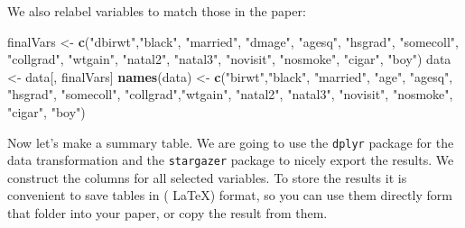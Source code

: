 \documentclass[]{book}
\newenvironment{Shaded}{\begin{snugshade}}{\end{snugshade}}
\newcommand{\KeywordTok}[1]{\textcolor[rgb]{0.13,0.29,0.53}{\textbf{#1}}}
\newcommand{\DecValTok}[1]{\textcolor[rgb]{0.00,0.00,0.81}{#1}}
\newcommand{\StringTok}[1]{\textcolor[rgb]{0.31,0.60,0.02}{#1}}
\newcommand{\OperatorTok}[1]{\textcolor[rgb]{0.81,0.36,0.00}{\textbf{#1}}}
\newcommand{\NormalTok}[1]{#1}
\begin{document}
We also relabel variables to match those in the paper:

\begin{Shaded}
\begin{Highlighting}[]
\NormalTok{finalVars <-}\StringTok{ }\KeywordTok{c}\NormalTok{(}\StringTok{"dbirwt"}\NormalTok{,}\StringTok{"black"}\NormalTok{, }\StringTok{"married"}\NormalTok{, }\StringTok{"dmage"}\NormalTok{, }\StringTok{"agesq"}\NormalTok{, }\StringTok{"hsgrad"}\NormalTok{, }\StringTok{"somecoll"}\NormalTok{, }\StringTok{"collgrad"}\NormalTok{, }\StringTok{"wtgain"}\NormalTok{, }\StringTok{"natal2"}\NormalTok{, }\StringTok{"natal3"}\NormalTok{, }\StringTok{"novisit"}\NormalTok{, }\StringTok{"nosmoke"}\NormalTok{, }\StringTok{"cigar"}\NormalTok{, }\StringTok{"boy"}\NormalTok{)}
\NormalTok{data <-}\StringTok{ }\NormalTok{data[, finalVars]}
\KeywordTok{names}\NormalTok{(data) <-}\StringTok{ }\KeywordTok{c}\NormalTok{(}\StringTok{"birwt"}\NormalTok{,}\StringTok{"black"}\NormalTok{, }\StringTok{"married"}\NormalTok{, }\StringTok{"age"}\NormalTok{, }\StringTok{"agesq"}\NormalTok{, }\StringTok{"hsgrad"}\NormalTok{, }\StringTok{"somecoll"}\NormalTok{, }\StringTok{"collgrad"}\NormalTok{,}\StringTok{"wtgain"}\NormalTok{, }\StringTok{"natal2"}\NormalTok{, }\StringTok{"natal3"}\NormalTok{, }\StringTok{"novisit"}\NormalTok{, }\StringTok{"nosmoke"}\NormalTok{, }\StringTok{"cigar"}\NormalTok{, }\StringTok{"boy"}\NormalTok{) }
\end{Highlighting}
\end{Shaded}

Now let's make a summary table. We are going to use the \texttt{dplyr}
package \citep{R-dplyr} for the data transformation and the
\texttt{stargazer} package \citep{R-stargazer} to nicely export the
results. We construct the columns for all selected variables. To store
the results it is convenient to save tables in ( \LaTeX ) format, so you
can use them directly form that folder into your paper, or copy the
result from them.

\begin{Shaded}
\end{Shaded}
\end{document}
